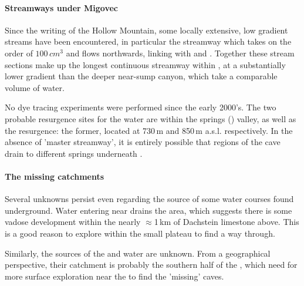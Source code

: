 \paragraph{Streamways under Migovec} Since the writing of the Hollow Mountain, some locally extensive, low gradient streams have been encountered, in particular the  streamway which takes on the order of $100\,cm^3$ and flows northwards, linking with  and . Together these stream sections make up the longest continuous streamway within , at a substantially lower gradient than the deeper near-sump canyon, which take a comparable volume of water. 
 


No dye tracing experiments were performed since the early 2000's. The two probable resurgence sites for the  water are within the  springs () valley, as well as the  resurgence: the former, located at 730\,m and 850\,m a.s.l. respectively. In the absence of 'master streamway', it is entirely possible that regions of the cave drain to different springs underneath . 

\paragraph{The missing catchments}
Several unknowns persist even regarding the source of some water courses found underground. Water entering near  drains the  area, which suggests there is some vadose development within the nearly $\approx$1\,km of Dachstein limestone above. This is a good reason to explore within the small  plateau to find a way through. 

Similarly, the sources of the  and  water are unknown. From a geographical perspective, their catchment is probably the southern half of the , which need for more surface exploration near the  to find the 'missing' caves. 


